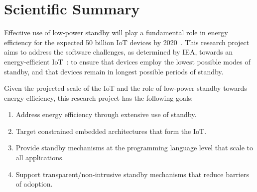 \documentclass[12pt,english]{amsart}
\begin{document}
\section{Scientific Summary}

Effective use of low-power standby will play a fundamental role in energy
efficiency for the expected 50 billion IoT devices by 2020~\cite{iea.data}.
%
This research project aims to address the software challenges, as determined by
IEA, towards an energy-efficient IoT~\cite{iea.data}:
    to ensure that devices employ the lowest possible modes of standby, and
    that devices remain in longest possible periods of standby.
%
\begin{comment}
    \item To ensure that devices employ the lowest possible modes of standby consumption.
    \item To ensure that devices remain in longest possible periods of standby time.
\end{comment}

Given the projected scale of the IoT and the role of low-power standby towards
energy efficiency, this research project has the following goals:

\begin{enumerate}
    \item Address energy efficiency through extensive use of standby.
    \item Target constrained embedded architectures that form the IoT.
    \item Provide standby mechanisms at the programming language level that scale to all applications.
    \item Support transparent/non-intrusive standby mechanisms that reduce barriers of adoption.
\end{enumerate}

\end{document}
